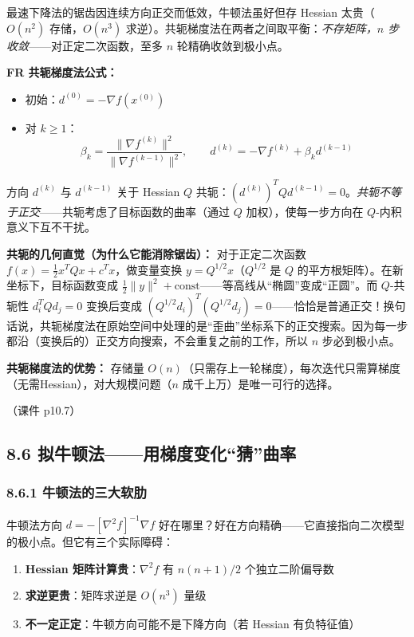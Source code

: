 最速下降法的锯齿因连续方向正交而低效，牛顿法虽好但存 Hessian 太贵（$O(n^2)$ 存储，$O(n^3)$ 求逆）。共轭梯度法在两者之间取平衡：\emph{不存矩阵，$n$ 步收敛}——对正定二次函数，至多 $n$ 轮精确收敛到极小点。

\textbf{FR 共轭梯度法公式：}
\begin{itemize}
  \item 初始：$d^{(0)} = -\nabla f(x^{(0)})$
  \item 对 $k \ge 1$：
  \[
  \beta_k = \frac{\|\nabla f^{(k)}\|^2}{\|\nabla f^{(k-1)}\|^2},\qquad
  d^{(k)} = -\nabla f^{(k)} + \beta_k d^{(k-1)}
  \]
\end{itemize}

方向 $d^{(k)}$ 与 $d^{(k-1)}$ 关于 Hessian $Q$ 共轭：$(d^{(k)})^T Q d^{(k-1)} = 0$。\emph{共轭不等于正交}——共轭考虑了目标函数的曲率（通过 $Q$ 加权），使每一步方向在 $Q$-内积意义下互不干扰。

\textbf{共轭的几何直觉（为什么它能消除锯齿）：} 对于正定二次函数 $f(x)=\frac12 x^T Q x + c^T x$，做变量变换 $y = Q^{1/2}x$（$Q^{1/2}$ 是 $Q$ 的平方根矩阵）。在新坐标下，目标函数变成 $\frac12\|y\|^2 + \text{const}$——等高线从“椭圆”变成“正圆”。而 $Q$-共轭性 $d_i^T Q d_j = 0$ 变换后变成 $(Q^{1/2}d_i)^T (Q^{1/2}d_j) = 0$——恰恰是普通正交！换句话说，共轭梯度法在原始空间中处理的是“歪曲”坐标系下的正交搜索。因为每一步都沿（变换后的）正交方向搜索，不会重复之前的工作，所以 $n$ 步必到极小点。

\textbf{共轭梯度法的优势：} 存储量 $O(n)$（只需存上一轮梯度），每次迭代只需算梯度（无需Hessian），对大规模问题（$n$ 成千上万）是唯一可行的选择。

（课件 p10.7）

\subsection{8.6 拟牛顿法——用梯度变化“猜”曲率}

\subsubsection{8.6.1 牛顿法的三大软肋}

牛顿法方向 $d = -[\nabla^2 f]^{-1}\nabla f$ 好在哪里？好在方向精确——它直接指向二次模型的极小点。但它有三个实际障碍：
\begin{enumerate}
  \item \textbf{Hessian 矩阵计算贵}：$\nabla^2 f$ 有 $n(n+1)/2$ 个独立二阶偏导数
  \item \textbf{求逆更贵}：矩阵求逆是 $O(n^3)$ 量级
  \item \textbf{不一定正定}：牛顿方向可能不是下降方向（若 Hessian 有负特征值）
\end{enumerate}

